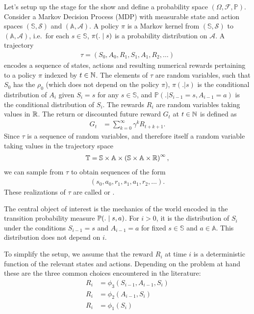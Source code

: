 \documentclass[a4paper,12pt]{amsart}
\newcommand{\stateSpace}{\mathbb S}
\newcommand{\stateSpaceAlg}{\mathcal S}
\newcommand{\actionSpace}{\mathbb A}
\newcommand{\actionSpaceAlg}{\mathcal A}
\newcommand{\policy}{\pi}
\newcommand{\discountFactor}{\gamma}
\newcommand{\prob}{\mathbb P}
\newcommand{\rewardFunc}{\phi}
\newcommand{\trajectory}{\tau}
\newcommand{\trajectorySpace}{\mathbb T}
\newcommand{\startStateDist}{\rho_0}
\begin{document}
Let's setup up the stage for the show and define a probability space
$\left( \Omega, \mathcal F, \prob \right)$.
Consider a Markov Decision Process (MDP) with measurable state and action spaces
$(\stateSpace, \stateSpaceAlg)$ and $(\actionSpace, \actionSpaceAlg)$.
A policy $\policy$ is a Markov kernel from $(\stateSpace, \stateSpaceAlg)$ to
$(\actionSpace, \actionSpaceAlg)$, i.e.\ for each $s\in\stateSpace$, 
$\policy(. \vb s)$ is a probability distribution on $\actionSpaceAlg$.
A trajectory
\begin{align*}
    \trajectory = \left( S_0, A_0, R_1, S_1, A_1, R_2, \ldots \right) 
\end{align*}
encodes a sequence of states, actions and resulting numerical rewards
pertaining to a policy $\policy$ indexed by $t\in\mathbb{N}$. The elements of $\tau$
are random variables, such that $S_{0}$ has the  
$\startStateDist$ (which does not depend on the policy $\pi$), 
$\policy(. | s)$ is the conditional distribution of $A_i$ given $S_i = s$ for
any $s\in\stateSpace$, and $\prob\left(. | S_{i-1}= s, A_{i-1}=a \right)$ is
the conditional distribution of $S_{i}$.  The rewards $R_i$ are random
variables taking values in $\mathbb{R}$.  The return or discounted future reward $G_t$
at $t\in\mathbb{N}$ is defined as
\begin{align*}
    G_t &= \sum_{k=0}^{\infty} \discountFactor^{k} R_{t+k+1}.
\end{align*}
Since $\trajectory$ is a sequence of random variables, and therefore itself a random
variable taking values in the trajectory space 
\begin{align*}
    \trajectorySpace = \stateSpace\times\actionSpace\times 
        \left( \stateSpace\times\actionSpace\times\R \right)^{\infty},
\end{align*}
we can sample from $\trajectory$ to obtain sequences of the form
\begin{align*}
    \left( s_0, a_0, r_1, s_1, a_1, r_2,\ldots \right).
\end{align*}
These realizations of $\tau$ are called  or .

The central object of interest is the mechanics of the world encoded in the
transition probability measure $\prob(. \vb s, a)$. For $i>0$, it is the distribution of
$S_i$ under the conditions $S_{i-1} = s$ and $A_{i-1} = a$ for fixed
$s\in\stateSpace$ and $a\in\actionSpace$. This distribution does not depend on $i$. 

To simplify the setup, we assume that the reward $R_i$ at time $i$ is a deterministic
function of the relevant states and actions. Depending on the problem at hand
these are the three common choices encountered in the literature:
\begin{align}
    R_{i} &= \rewardFunc_{3}(S_{i-1}, A_{i-1}, S_{i}) \\
    R_{i} &= \rewardFunc_{2}(A_{i-1}, S_{i}) \\
    R_{i} &= \rewardFunc_{1}(S_{i})
\end{align}
\end{document}

